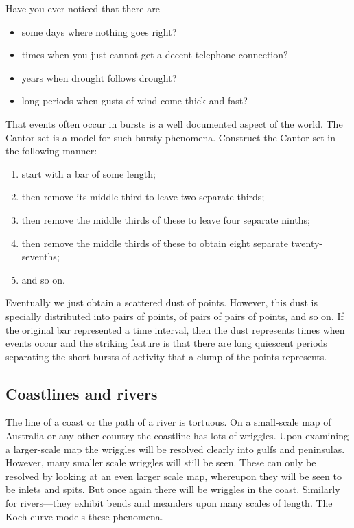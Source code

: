 \documentclass[12pt,a5paper]{article}
\begin{document}
Have you ever noticed that there are    
\begin{itemize}
	\item  some days where nothing goes right?

	\item  times when you just cannot get a decent telephone connection?

	\item  years when drought follows drought?

	\item  long periods when gusts of wind come thick and fast?
\end{itemize}
That events often occur in bursts 
is a well documented aspect of the world.  The Cantor set is a model 
for such bursty phenomena.  Construct the Cantor set in the following 
manner:
\begin{enumerate}
	\item  start with a bar of some length; 

	\item  then remove its middle third to leave two separate thirds; 

	\item  then remove the middle thirds of these to leave four separate ninths; 

	\item  then remove the middle thirds of these to 
	obtain eight separate twenty-sevenths; 

	\item  and so on.  
\end{enumerate}
Eventually we just 
obtain a scattered dust of points.  However, this dust is specially 
distributed into pairs of points, of pairs of pairs of points, and so 
on.  If the original bar represented a time interval, then the dust 
represents times when events occur and the striking feature is that 
there are long quiescent periods separating the short bursts of 
activity that a clump of the points represents.

\subsection{Coastlines and rivers}

The line of a coast or the path of a river is tortuous.  On a 
small-scale map of Australia or any other country the coastline has 
lots of wriggles.  Upon examining a larger-scale map the wriggles 
will be resolved clearly into gulfs and peninsulas.  However, many 
smaller scale wriggles will still be seen.  These can only be 
resolved by looking at an even larger scale map, whereupon they will 
be seen to be inlets and spits.  But once again there will be 
wriggles in the coast.  Similarly for rivers---they exhibit bends and 
meanders upon many scales of length.  The Koch curve models these 
phenomena.
\end{document}
